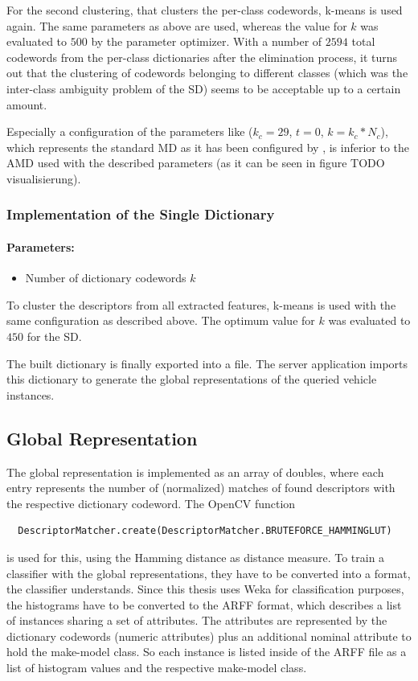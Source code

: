 For the second clustering, that clusters the per-class codewords, k-means is used again. The same parameters as above are used, whereas the value for $k$ was evaluated to $500$ by the parameter optimizer. With a number of $2594$ total codewords from the per-class dictionaries after the elimination process, it turns out that the clustering of codewords belonging to different classes (which was the inter-class ambiguity problem of the SD) seems to be acceptable up to a certain amount.

Especially a configuration of the parameters like ($k_c = 29$, $t = 0$, $k = k_c * N_c$), which represents the standard MD as it has been configured by \citep{siddiqui2015robust}, is inferior to the AMD used with the described parameters (as it can be seen in figure TODO visualisierung).

\subsubsection{Implementation of the Single Dictionary}
\paragraph{Parameters:}
\begin{itemize}
  \item Number of dictionary codewords $k$
\end{itemize}
To cluster the descriptors from all extracted features, k-means is used with the same configuration as described above. The optimum value for $k$ was evaluated to $450$ for the SD.

The built dictionary is finally exported into a file. The server application imports this dictionary to generate the global representations of the queried vehicle instances.

\subsection{Global Representation}\label{sec:globalRepresentationImpl}
The global representation is implemented as an array of doubles, where each entry represents the number of (normalized) matches of found descriptors with the respective dictionary codeword. The OpenCV function
\begin{verbatim}
  DescriptorMatcher.create(DescriptorMatcher.BRUTEFORCE_HAMMINGLUT)
\end{verbatim}
is used for this, using the Hamming distance as distance measure. To train a classifier with the global representations, they have to be converted into a format, the classifier understands. Since this thesis uses Weka for classification purposes, the histograms have to be converted to the ARFF format, which describes a list of instances sharing a set of attributes. The attributes are represented by the dictionary codewords (numeric attributes) plus an additional nominal attribute to hold the make-model class. So each instance is listed inside of the ARFF file as a list of histogram values and the respective make-model class.

